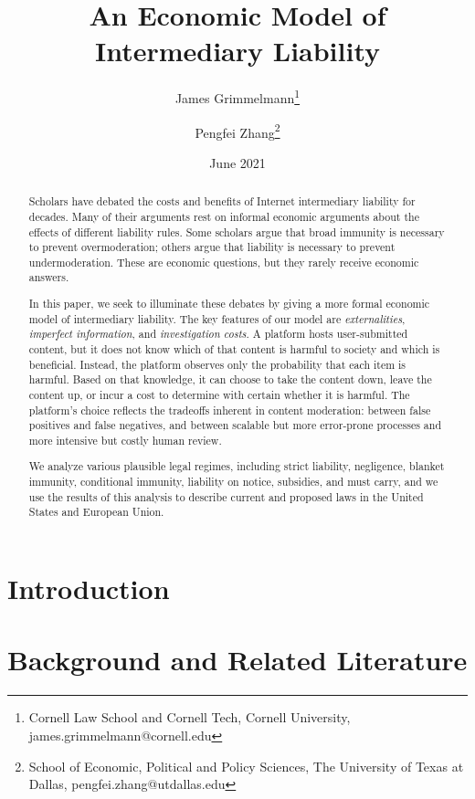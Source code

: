\documentclass[openbib,12pt]{article}  %
\title{An Economic Model of Intermediary Liability}
\author{James Grimmelmann\footnote{Cornell Law School and Cornell Tech, Cornell University, james.grimmelmann@cornell.edu}
\and Pengfei Zhang\footnote{School of Economic, Political and Policy Sciences, The University of Texas at Dallas, pengfei.zhang@utdallas.edu}}
\date{June 2021}
\begin{document}
\maketitle

\begin{abstract}
\noindent 
Scholars have debated the costs and benefits of Internet intermediary liability for decades. Many of their arguments rest on informal economic arguments about the effects of different liability rules. Some scholars argue that broad immunity is necessary to prevent overmoderation; others argue that liability is necessary to prevent undermoderation. These are economic questions, but they rarely receive economic answers.

In this paper, we seek to illuminate these debates by giving a more formal economic model of intermediary liability. The key features of our model are \emph{externalities}, \emph{imperfect information}, and \emph{investigation costs}. A platform hosts user-submitted content, but it does not know which of that content is harmful to society and which is beneficial. Instead, the platform observes only the probability that each item is harmful. Based on that knowledge, it can choose to take the content down, leave the content up, or incur a cost to determine with certain whether it is harmful. The platform's choice reflects the tradeoffs inherent in content moderation: between false positives and false negatives, and between scalable but more error-prone processes and more intensive but costly human review.

We analyze various plausible legal regimes, including strict liability, negligence, blanket immunity, conditional immunity, liability on notice, subsidies, and must carry, and we use the results of this analysis to describe current and proposed laws in the United States and European Union.

\vspace{0in}

\end{abstract}

\newpage
\tableofcontents

\newpage

\section{Introduction}\label{EMIL_Section:intro}


\section{Background and Related Literature}\label{EMIL_Section:inst}





\end{document}
